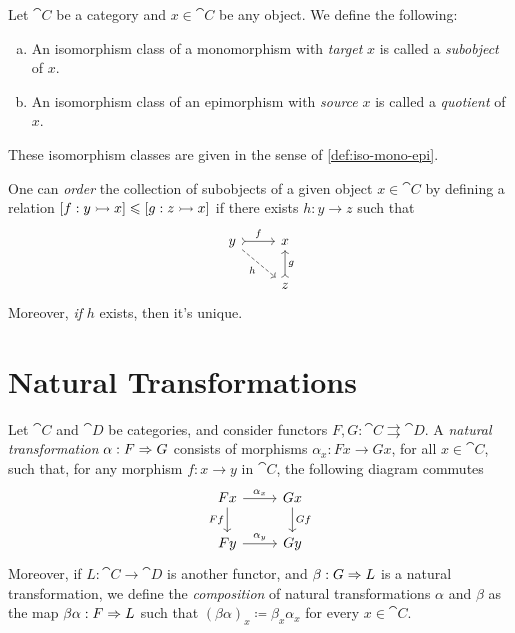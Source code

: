 \begin{definition}
    \label{def:subobject-quotient}
    Let \(\cat C\) be a category and \(x \in \cat C\) be any object. We define the
    following:
    \begin{enumerate}[(a)]\setlength\itemsep{0em}
        \item An isomorphism class of a monomorphism with \emph{target} \(x\) is called a
              \emph{subobject} of \(x\).
        \item An isomorphism class of an epimorphism with \emph{source} \(x\) is called a
              \emph{quotient} of \(x\).
    \end{enumerate}
    These isomorphism classes are given in the sense of \cref{def:iso-mono-epi}.
\end{definition}

\begin{example}
    \label{exp:order-subobject}
    One can \emph{order} the collection of subobjects of a given object \(x \in \cat
    C\) by defining a relation \([f: y \rightarrowtail x] \leqslant [g: z \rightarrowtail x]\) if there
    exists \(h: y \to z\) such that
    \[
        \begin{tikzcd}
            y \ar[r, tail, "f"] \ar[rd, dashed, swap, "h"] &x \\
            &z \ar[u, tail, swap, "g"]
        \end{tikzcd}
    \]
    Moreover, \emph{if} \(h\) exists, then it's unique.
\end{example}


\section{Natural Transformations}

\begin{definition}
    \label{def:natural-transformation}
    Let \(\cat C\) and \(\cat D\) be categories, and consider functors \(F, G:
    \cat C \rightrightarrows \cat D\). A \emph{natural transformation} \(\alpha: F
    \Rightarrow G\) consists of morphisms \(\alpha_x: F x \to G x\), for all \(x \in \cat
    C\), such that, for any morphism \(f: x \to y\) in \(\cat C\), the following
    diagram commutes
    \[
        \begin{tikzcd}
            F x \ar[r, "\alpha_x"] \ar[d, swap, "F f"]
            &G x \ar[d, "G f"] \\
            F y \ar[r, "\alpha_y"] &Gy
        \end{tikzcd}
    \]
    Moreover, if \(L: \cat C \to \cat D\) is another functor, and \(\beta: G \Rightarrow
    L\) is a natural transformation, we define the \emph{composition} of natural
    transformations \(\alpha\) and \(\beta\) as the map \(\beta \alpha: F \Rightarrow L\)
    such that \((\beta \alpha)_x \coloneq \beta_x \alpha_x\) for every \(x \in \cat
    C\).
\end{definition}

